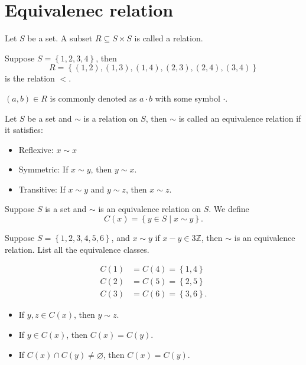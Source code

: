 \section{Equivalenec relation}
\begin{definition}[relation]
    Let \(S\) be a set. A subset \(R \subseteq S \times S \) is called a relation.   
\end{definition}

\begin{eg}
    Suppose \(S = \left\{ 1,2,3,4 \right\} \), then
    \[
        R = \left\{ (1,2), (1,3), (1,4), (2,3), (2,4), (3,4) \right\} 
    \] is the relation \(<\). 
\end{eg}

\begin{notation}
    \((a, b) \in R\) is commonly denoted as \(a \cdot b\) with some symbol \(\cdot\).    
\end{notation}

\begin{definition} \label{def: equivalence relation}
    Let \(S\) be a set and \(\sim\) is a relation on \(S\), then \(\sim \) is called an equivalence relation if it satisfies:
    \begin{itemize}
        \item Reflexive: \(x\sim x\)
        \item Symmetric: If \(x\sim y\), then \(y\sim x\). 
        \item Transitive: If \(x\sim y\) and \(y\sim z\), then \(x\sim z\).      
    \end{itemize}   
\end{definition}

\begin{definition} \label{def: equivalence class}
    Suppose \(S\) is a set and \(\sim \) is an equivalence relation on \(S\). We define 
    \[
        C(x) = \left\{ y \in S \mid x\sim y \right\}.
    \]   
\end{definition}

\begin{eg}
    Suppose \(S = \left\{ 1,2,3,4,5,6 \right\} \), and \(x \sim y\) if \(x - y \in 3\mathbb{Z} \), then \(\sim \) is an equivalence relation. List all the equivalence classes.    
\end{eg}
\begin{explanation}
    
    \begin{align*}
        C(1) &= C(4) = \left\{ 1, 4 \right\} \\
        C(2) &= C(5) = \left\{ 2, 5 \right\} \\
        C(3) &= C(6) = \left\{ 3, 6 \right\}.   
    \end{align*}
\end{explanation}


\begin{theorem}
    \vphantom{text}
    \begin{itemize}
        \item If \(y, z \in C(x)\), then \(y \sim z\). 
        \item If \(y \in C(x)\), then \(C(x) = C(y)\). 
        \item If \(C(x) \cap C(y) \neq \varnothing \), then \(C(x) = C(y)\).     
    \end{itemize}
\end{theorem}